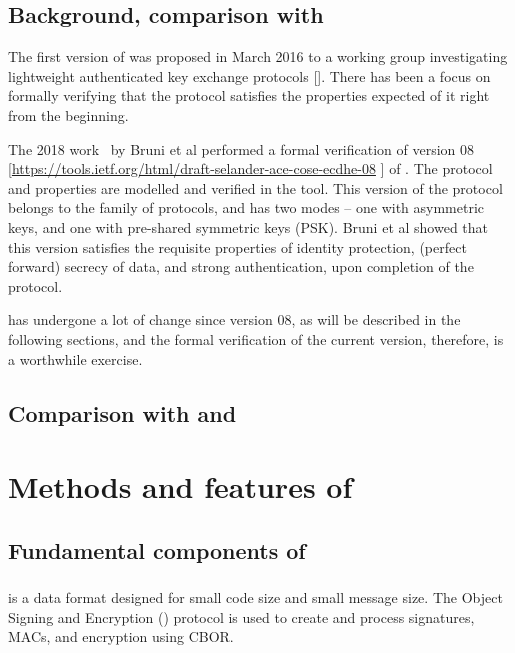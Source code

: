 \subsection{Background, comparison with~\cite{DBLP:conf/secsr/BruniJPS18}}
The first version of \mEdhoc was proposed in March 2016 to a working group investigating lightweight authenticated key exchange protocols [\mcneed]. There has been a focus on formally verifying that the protocol satisfies the properties expected of it right from the beginning. 

The 2018 work~\cite{DBLP:conf/secsr/BruniJPS18} by Bruni et al performed a formal verification of version 08 [\url{https://tools.ietf.org/html/draft-selander-ace-cose-ecdhe-08} \mcfix] of \mEdhoc. The protocol and properties are modelled and verified in the \mProverif tool. This version of the protocol belongs to the \mSigmaI family of protocols, and has two modes -- one with asymmetric keys, and one with pre-shared symmetric keys (PSK). Bruni et al showed that this version satisfies the requisite properties of identity protection, (perfect forward) secrecy of data, and strong authentication, upon completion of the protocol.

\mEdhoc has undergone a lot of change since version 08, as will be described in the following sections, and the formal verification of the current version, therefore, is a worthwhile exercise.

\subsection{Comparison with \mOptls and \mNoise}


\section{Methods and features of \mEdhoc}\label{sec:methods}

\subsection{Fundamental components of \mEdhoc}
\subsubsection{\mCose}
\mCbor is a data format designed for small code size and small message size. The \mCbor Object Signing and Encryption (\mCose) protocol is used to create and process signatures, MACs, and encryption using CBOR. 

